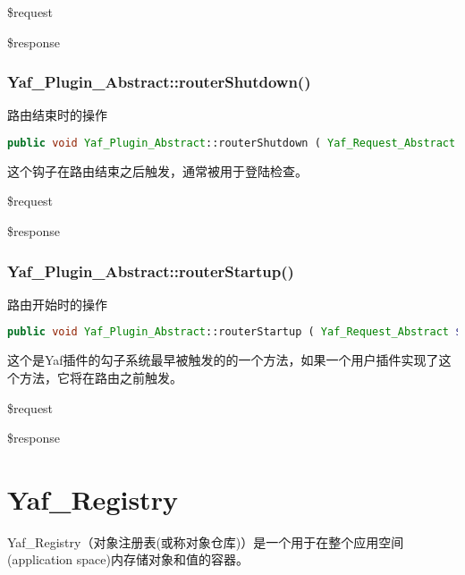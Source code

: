 \begin{compactitem}
\item \$request
\item \$response
\end{compactitem}

\subsection{Yaf\_Plugin\_Abstract::routerShutdown()}

路由结束时的操作






\begin{lstlisting}[language=PHP]
public void Yaf_Plugin_Abstract::routerShutdown ( Yaf_Request_Abstract $request , Yaf_Response_Abstract $response )
\end{lstlisting}

这个钩子在路由结束之后触发，通常被用于登陆检查。

\begin{compactitem}
\item \$request
\item \$response
\end{compactitem}


\subsection{Yaf\_Plugin\_Abstract::routerStartup()}

路由开始时的操作


\begin{lstlisting}[language=PHP]
public void Yaf_Plugin_Abstract::routerStartup ( Yaf_Request_Abstract $request , Yaf_Response_Abstract $response )
\end{lstlisting}

这个是Yaf插件的勾子系统最早被触发的的一个方法，如果一个用户插件实现了这个方法，它将在路由之前触发。


\begin{compactitem}
\item \$request
\item \$response
\end{compactitem}

\chapter{Yaf\_Registry}

Yaf\_Registry（对象注册表(或称对象仓库)）是一个用于在整个应用空间(application space)内存储对象和值的容器。

